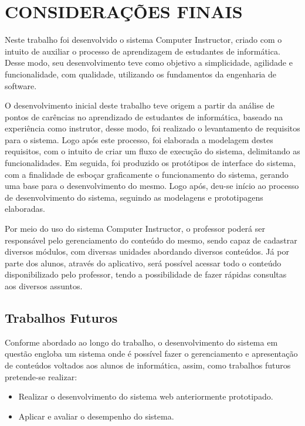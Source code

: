 
\chapter{CONSIDERAÇÕES FINAIS}
\label{chap:consideracoesFinais}
Neste trabalho foi desenvolvido o sistema Computer Instructor, criado com o intuito de auxiliar o processo de aprendizagem de estudantes de informática. Desse modo, seu desenvolvimento teve como objetivo a simplicidade, agilidade e funcionalidade, com qualidade, utilizando os fundamentos da engenharia de software.

O desenvolvimento inicial deste trabalho teve origem a partir da análise de pontos de carências no aprendizado de estudantes de informática, baseado na experiência como instrutor, desse modo, foi realizado o levantamento de requisitos para o sistema. Logo após este processo, foi elaborada a modelagem destes requisitos, com o intuito de criar um fluxo de execução do sistema, delimitando as funcionalidades. Em seguida, foi produzido os protótipos de interface do sistema, com a finalidade de esboçar graficamente o funcionamento do sistema, gerando uma base para o desenvolvimento do mesmo. Logo após, deu-se início ao processo de desenvolvimento do sistema, seguindo as modelagens e prototipagens elaboradas.

Por meio do uso do sistema Computer Instructor, o professor poderá ser responsável pelo gerenciamento do conteúdo do mesmo, sendo capaz de cadastrar diversos módulos, com diversas unidades abordando diversos conteúdos. Já por parte dos alunos, através do aplicativo, será possível acessar todo o conteúdo disponibilizado pelo professor, tendo a possibilidade de fazer rápidas consultas aos diversos assuntos.


\section{Trabalhos Futuros}
\label{sec:trabalhosFuturos}

Conforme abordado ao longo do trabalho, o desenvolvimento do sistema em questão engloba um sistema onde é possível fazer o gerenciamento e apresentação de conteúdos voltados aos alunos de informática, assim, como trabalhos futuros pretende-se realizar:

\begin{itemize}
    \item Realizar o desenvolvimento do sistema web anteriormente prototipado.
    \item Aplicar e avaliar o desempenho do sistema.

\end{itemize}
